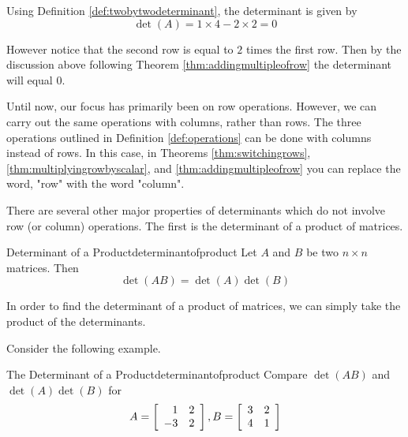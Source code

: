 \begin{solution}
Using Definition \ref{def:twobytwodeterminant}, the determinant is given by
\[
\det \left( A \right) = 1 \times 4 - 2 \times 2 = 0
\]

However notice that the second row is equal to $2$ times the first row. Then by the discussion above following Theorem \ref{thm:addingmultipleofrow} the determinant will equal $0$.
\end{solution}

Until now, our focus has primarily been on row operations. However, we can carry out the 
same operations with columns, rather than rows. The three operations outlined in
Definition \ref{def:operations} can be done with columns instead of rows. 
In this case, in Theorems \ref{thm:switchingrows}, \ref{thm:multiplyingrowbyscalar}, 
and \ref{thm:addingmultipleofrow} you can replace
the word, "row" with the word "column".

There are several other major properties of determinants which do not involve
row (or column) operations. The first is the determinant of a product of matrices. 

\begin{theorem}{Determinant of a Product}{determinantofproduct}
Let $A$ and $B$ be two $n\times n$ matrices. Then
\begin{equation*}
\det \left( AB\right) =\det \left( A\right) \det \left( B\right)
\end{equation*}
\end{theorem}

In order to find the determinant of a product of matrices, we can simply take the product of the determinants. 

Consider the following example.

\begin{example}{The Determinant of a Product}{determinantofproduct}
Compare $\det \left( AB\right) $ and $\det \left( A\right) \det \left(
B\right) $ for
\begin{equation*}
A=\left[
\begin{array}{rr}
1 & 2 \\
-3 & 2
\end{array}
\right] ,B=\left[
\begin{array}{rr}
3 & 2 \\
4 & 1
\end{array}
\right] 
\end{equation*}
\end{example}


